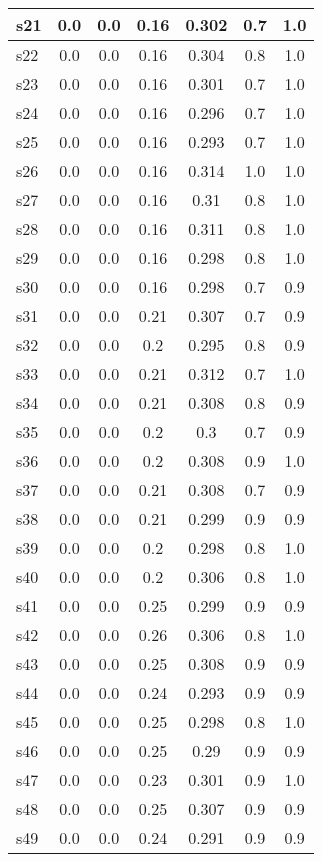\documentclass{article}
\begin{document}
\begin{tabular}{|l|c|c|c|c|c|c|}
\hline
s21 &0.0 & 0.0 & 0.16 & 0.302 & 0.7 & 1.0\\
\hline
s22 &0.0 & 0.0 & 0.16 & 0.304 & 0.8 & 1.0\\
\hline
s23 &0.0 & 0.0 & 0.16 & 0.301 & 0.7 & 1.0\\
\hline
s24 &0.0 & 0.0 & 0.16 & 0.296 & 0.7 & 1.0\\
\hline
s25 &0.0 & 0.0 & 0.16 & 0.293 & 0.7 & 1.0\\
\hline
s26 &0.0 & 0.0 & 0.16 & 0.314 & 1.0 & 1.0\\
\hline
s27 &0.0 & 0.0 & 0.16 & 0.31 & 0.8 & 1.0\\
\hline
s28 &0.0 & 0.0 & 0.16 & 0.311 & 0.8 & 1.0\\
\hline
s29 &0.0 & 0.0 & 0.16 & 0.298 & 0.8 & 1.0\\
\hline
s30 &0.0 & 0.0 & 0.16 & 0.298 & 0.7 & 0.9\\
\hline
s31 &0.0 & 0.0 & 0.21 & 0.307 & 0.7 & 0.9\\
\hline
s32 &0.0 & 0.0 & 0.2 & 0.295 & 0.8 & 0.9\\
\hline
s33 &0.0 & 0.0 & 0.21 & 0.312 & 0.7 & 1.0\\
\hline
s34 &0.0 & 0.0 & 0.21 & 0.308 & 0.8 & 0.9\\
\hline
s35 &0.0 & 0.0 & 0.2 & 0.3 & 0.7 & 0.9\\
\hline
s36 &0.0 & 0.0 & 0.2 & 0.308 & 0.9 & 1.0\\
\hline
s37 &0.0 & 0.0 & 0.21 & 0.308 & 0.7 & 0.9\\
\hline
s38 &0.0 & 0.0 & 0.21 & 0.299 & 0.9 & 0.9\\
\hline
s39 &0.0 & 0.0 & 0.2 & 0.298 & 0.8 & 1.0\\
\hline
s40 &0.0 & 0.0 & 0.2 & 0.306 & 0.8 & 1.0\\
\hline
s41 &0.0 & 0.0 & 0.25 & 0.299 & 0.9 & 0.9\\
\hline
s42 &0.0 & 0.0 & 0.26 & 0.306 & 0.8 & 1.0\\
\hline
s43 &0.0 & 0.0 & 0.25 & 0.308 & 0.9 & 0.9\\
\hline
s44 &0.0 & 0.0 & 0.24 & 0.293 & 0.9 & 0.9\\
\hline
s45 &0.0 & 0.0 & 0.25 & 0.298 & 0.8 & 1.0\\
\hline
s46 &0.0 & 0.0 & 0.25 & 0.29 & 0.9 & 0.9\\
\hline
s47 &0.0 & 0.0 & 0.23 & 0.301 & 0.9 & 1.0\\
\hline
s48 &0.0 & 0.0 & 0.25 & 0.307 & 0.9 & 0.9\\
\hline
s49 &0.0 & 0.0 & 0.24 & 0.291 & 0.9 & 0.9\\

\end{tabular}
\end{document}
